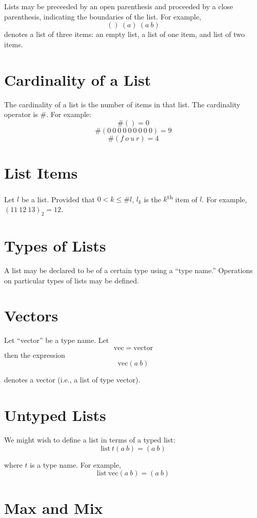 \documentclass{article}
\begin{document}
Lists may be preceeded by an open parenthesis and proceeded by
a close parenthesis, indicating the boundaries of the list.
For example,
$$()\ (a)\ (a\ b)$$
denotes a list of three items: an empty list, a list of one item, and list of two items.
\section{Cardinality of a List}
The cardinality of a list is the number of items in that list.
The cardinality operator is $\#$.
For example:
$$\#()=0$$
$$\#(0\ 0\ 0\ 0\ 0\ 0\ 0\ 0\ 0)=9$$
$$\#(f\ o\ u\ r)=4$$

\section{List Items}

Let $l$ be a list.
Provided that $0<k\le \#l$,
$l_k$ is the $k$\textsuperscript{th} item of $l$.
For example, $(11\ 12\ 13)_2=12$.

\section{Types of Lists}

A list may be declared to be of a certain type using a ``type name.''
Operations on particular types of lists may be defined.

\section{Vectors}

Let ``vector'' be a type name. Let
$$\mathrm{vec} = \mathrm{vector}$$
then the expression
$$\mathrm{vec}(a\ b)$$

\noindent
denotes a vector (i.e., a list of type vector).

\section{Untyped Lists}

We might wish to define a list in terms of a typed list:
$$\mathrm{list}\ t(a\ b) = (a\ b)$$

\noindent
where $t$ is a type name. For example,
$$\mathrm{list}\ \mathrm{vec} (a\ b) = (a\ b)$$

\section{Max and Mix}
\end{document}
